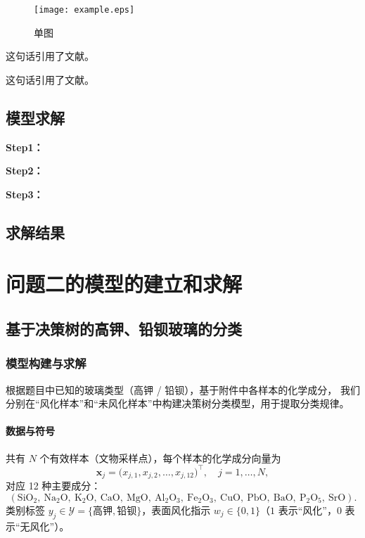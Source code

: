 \documentclass[withoutpreface,bwprint]{cumcmthesis}
\begin{document}

\begin{figure}[ht]
\centering
\texttt{[image: example.eps]}
\caption{单图}
\label{fig:单图}
\end{figure}

这句话引用了文献\cite{司守奎2011数学建模算法与应用}。

这句话引用了文献。

\subsection{模型求解}

\textbf{Step1：} 

\textbf{Step2：} 

\textbf{Step3：} 

\subsection{求解结果}



\section{问题二的模型的建立和求解}
\subsection{基于决策树的高钾、铅钡玻璃的分类}

\subsubsection{模型构建与求解}

根据题目中已知的玻璃类型（高钾 / 铅钡），基于附件中各样本的化学成分，
我们分别在“风化样本”和“未风化样本”中构建决策树分类模型，用于提取分类规律。

\paragraph{数据与符号}
共有 $N$ 个有效样本（文物采样点），每个样本的化学成分向量为
\[
\mathbf{x}_j=\big(x_{j,1},x_{j,2},\ldots,x_{j,12}\big)^\top,\quad j=1,\ldots,N,
\]
对应 12 种主要成分：
\[
(\text{SiO}_2,\ \text{Na}_2\text{O},\ \text{K}_2\text{O},\ \text{CaO},\ \text{MgO},\ \text{Al}_2\text{O}_3,\ 
\text{Fe}_2\text{O}_3,\ \text{CuO},\ \text{PbO},\ \text{BaO},\ \text{P}_2\text{O}_5,\ \text{SrO}).
\]
类别标签 $y_j\in\mathcal{Y}=\{\text{高钾},\text{铅钡}\}$，表面风化指示 $w_j\in\{0,1\}$（$1$ 表示“风化”，$0$ 表示“无风化”）。
\end{document}
